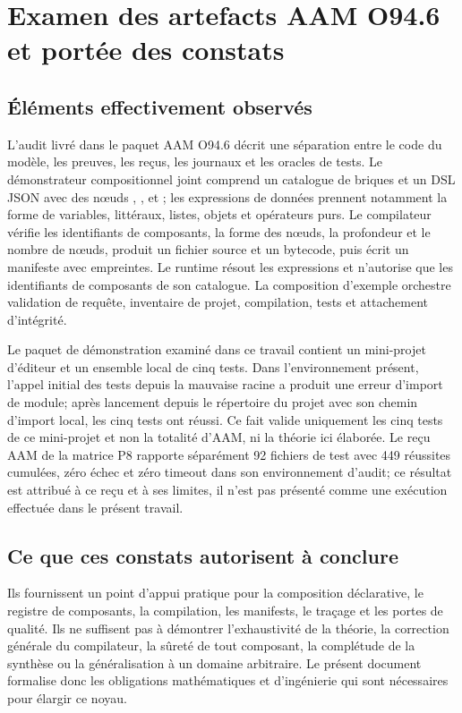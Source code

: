 \documentclass[11pt,a4paper]{article}
\newcommand{\code}[1]{\path{#1}}
\theoremstyle{definition}
\theoremstyle{plain}
\theoremstyle{remark}
\begin{document}
\section{Examen des artefacts AAM O94.6 et portée des constats}
\subsection{Éléments effectivement observés}
L'audit livré dans le paquet AAM O94.6 décrit une séparation entre le code du modèle, les preuves, les reçus, les journaux et les oracles de tests. Le démonstrateur compositionnel joint comprend un catalogue de briques et un DSL JSON avec des nœuds \code{invoke}, \code{sequence}, \code{condition} et \code{map}; les expressions de données prennent notamment la forme de variables, littéraux, listes, objets et opérateurs purs. Le compilateur vérifie les identifiants de composants, la forme des nœuds, la profondeur et le nombre de nœuds, produit un fichier source et un bytecode, puis écrit un manifeste avec empreintes. Le runtime résout les expressions et n'autorise que les identifiants de composants de son catalogue. La composition d'exemple orchestre validation de requête, inventaire de projet, compilation, tests et attachement d'intégrité.

Le paquet de démonstration examiné dans ce travail contient un mini-projet d'éditeur et un ensemble local de cinq tests. Dans l'environnement présent, l'appel initial des tests depuis la mauvaise racine a produit une erreur d'import de module; après lancement depuis le répertoire du projet avec son chemin d'import local, les cinq tests ont réussi. Ce fait valide uniquement les cinq tests de ce mini-projet et non la totalité d'AAM, ni la théorie ici élaborée. Le reçu AAM de la matrice P8 rapporte séparément 92 fichiers de test avec 449 réussites cumulées, zéro échec et zéro timeout dans son environnement d'audit; ce résultat est attribué à ce reçu et à ses limites, il n'est pas présenté comme une exécution effectuée dans le présent travail.

\subsection{Ce que ces constats autorisent à conclure}
Ils fournissent un point d'appui pratique pour la composition déclarative, le registre de composants, la compilation, les manifests, le traçage et les portes de qualité. Ils ne suffisent pas à démontrer l'exhaustivité de la théorie, la correction générale du compilateur, la sûreté de tout composant, la complétude de la synthèse ou la généralisation à un domaine arbitraire. Le présent document formalise donc les obligations mathématiques et d'ingénierie qui sont nécessaires pour élargir ce noyau.
\end{document}
